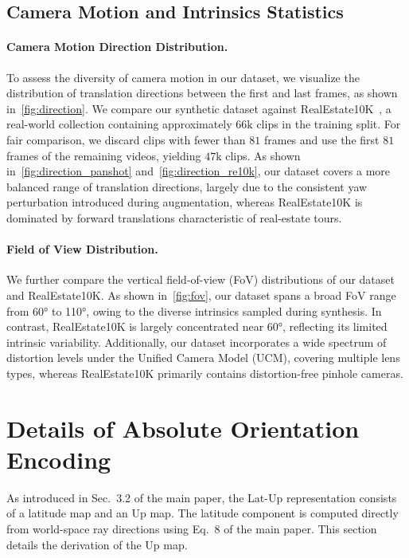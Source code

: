 \subsection{Camera Motion and Intrinsics Statistics}





\paragraph{Camera Motion Direction Distribution.}
To assess the diversity of camera motion in our dataset, we visualize the distribution of translation directions between the first and last frames, as shown in~\cref{fig:direction}.
We compare our synthetic dataset against RealEstate10K~\cite{zhou2018stereo}, a real-world collection containing approximately \(66\mathrm{k}\) clips in the training split.
For fair comparison, we discard clips with fewer than \(81\) frames and use the first \(81\) frames of the remaining videos, yielding \(47\mathrm{k}\) clips.
As shown in~\cref{fig:direction_panshot} and~\cref{fig:direction_re10k}, our dataset covers a more balanced range of translation directions, largely due to the consistent yaw perturbation introduced during augmentation, whereas RealEstate10K is dominated by forward translations characteristic of real-estate tours.

\paragraph{Field of View Distribution.}
We further compare the vertical field-of-view (FoV) distributions of our dataset and RealEstate10K.
As shown in~\cref{fig:fov}, our dataset spans a broad FoV range from 60° to 110°, owing to the diverse intrinsics sampled during synthesis.
In contrast, RealEstate10K is largely concentrated near 60°, reflecting its limited intrinsic variability.
Additionally, our dataset incorporates a wide spectrum of distortion levels under the Unified Camera Model (UCM), covering multiple lens types, whereas RealEstate10K primarily contains distortion-free pinhole cameras.



\section{Details of Absolute Orientation Encoding}
\label{sec:abs_orient}

As introduced in Sec.~3.2 of the main paper, the Lat-Up representation consists
of a latitude map and an Up map. The latitude component is computed directly
from world-space ray directions using Eq.~8 of the main paper. This section
details the derivation of the Up map.

